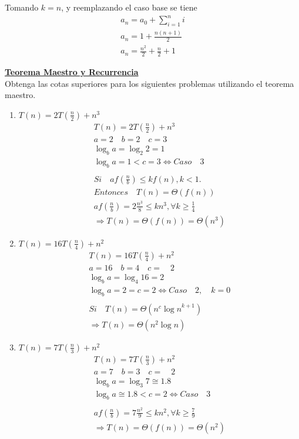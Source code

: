 \documentclass[dcc,uchile,sol]{fcfmcourse}
\newcommand{\ptitle}[1]{\underline{\textbf{#1}}}
\begin{document}
\begin{problems}
\begin{enumerate}
    Tomando $k = n$, y reemplazando el caso base se tiene
    \begin{align*}
    a_n = a_0 + \sum_{i = 1}^{n} i \\
    a_n = 1 + \frac{n(n+1)}{2} \\
    a_n = \frac{n^2}{2} + \frac{n}{2} + 1
    \end{align*}
    
\end{enumerate}


\problem \ptitle{Teorema Maestro y Recurrencia}\\
Obtenga las cotas superiores para los siguientes problemas utilizando el teorema maestro.
\begin{enumerate}
    \item $T(n)=2T(\frac{n}{2})+n^3$
    \begin{align*}
        T(n)=2T(\frac { n }{ 2 } )+{ n }^{ 3 }\\
        a=2\quad b=2\quad c=3 \\
        \log _{ b }{ a } =\log _{ 2 }{ 2 } =1 \\
        \log _{ b }{ a }=1<c=3\Leftrightarrow Caso\quad3 \\ \\
        Si\quad af(\frac{n}{b})\le kf(n), k<1.\\
        Entonces\quad T(n)=\Theta(f(n)) \\
        af(\frac{n}{b})=2\frac{n^3}{8} \le kn^3, \forall k\ge \frac{1}{4} \\
        \Rightarrow T(n)=\Theta(f(n))=\Theta(n^3)
    \end{align*}
    \item $T(n)=16T(\frac{n}{4})+n^2$
    \begin{align*}
        T(n)=16T(\frac { n }{ 4 } )+n^{ 2 }\\ a=16\quad b=4\quad c=\quad 2\\ \log _{ b }{ a } =\log _{ 4 }{ 16 } =2\\ \log _{ b }{ a } =2=c=2\Leftrightarrow Caso\quad 2,\quad k=0\\ \\ Si\quad T(n)=\Theta ({ n }^{ c }{ \log { n }  }^{ k+1 })\\ \Rightarrow T(n)=\Theta ({ n }^{ 2 }\log { n } )
    \end{align*}
    \item $T(n)=7T(\frac{n}{3})+n^2$
    \begin{align*}
        T(n)=7T(\frac { n }{ 3 } )+n^{ 2 }\\ a=7\quad b=3\quad c=\quad 2\\ \log _{ b }{ a } =\log _{ 3 }{ 7 } \cong 1.8\\ \log _{ b }{ a } \cong 1.8<c=2\Leftrightarrow Caso\quad 3\\ \\ af(\frac { n }{ b } )=7\frac { n^{ 2 } }{ 9 } \le kn^{ 2 },\forall k\ge \frac { 7 }{ 9 } \\ \Rightarrow T(n)=\Theta (f(n))=\Theta (n^{ 2 })

\end{align*}
\end{enumerate}
\end{problems}
\end{document}
